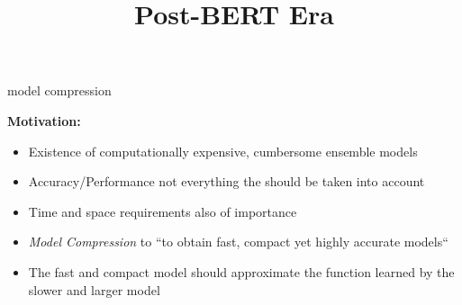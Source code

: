 



\newcommand{\titlefigure}{figure/53-distillation.png}
\newcommand{\learninggoals}{
\item soft vs. hard targets
\item understand how distillation works
\item DistilBERT
\item other approaches towards compression}

\title{Post-BERT Era}
\date{}




\begin{frame}{model compression}

\vfill

\textbf{Motivation:} 

\begin{itemize}
				\item Existence of computationally expensive, cumbersome ensemble models
				\item Accuracy/Performance not everything the should be taken into account
				\item Time and space requirements also of importance
				\item \textit{Model Compression} to ``to obtain fast, compact yet highly accurate models``
				\item The fast and compact model should approximate the function learned by the slower and larger model
\end{itemize}

\vfill

\end{frame}


